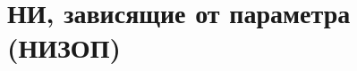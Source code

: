 \documentclass[../main.tex]{subfiles}
\begin{document}
 \chapter{НИ, зависящие от параметра (НИЗОП)}
 
\end{document}
